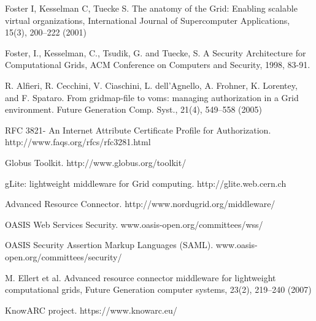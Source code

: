
\begin{thebibliography}{}
%
%

Foster I, Kesselman C, Tuecke S. The anatomy of the Grid: Enabling scalable virtual organizations, International Journal of Supercomputer Applications, 15(3), 200–222 (2001)

Foster, I., Kesselman, C., Tsudik, G. and Tuecke, S. A Security Architecture for Computational Grids, ACM Conference on Computers and Security, 1998, 83-91.

R. Alfieri, R. Cecchini, V. Ciaschini, L. dell’Agnello, A. Frohner, K. Lorentey, and F. Spataro. From gridmap-file to voms: managing authorization in a Grid environment. Future Generation Comp. Syst., 21(4), 549–558 (2005)

RFC 3821- An Internet Attribute Certificate Profile for Authorization. http://www.faqs.org/rfcs/rfc3281.html

Globus Toolkit. http://www.globus.org/toolkit/

gLite: lightweight middleware for Grid computing. http://glite.web.cern.ch

Advanced Resource Connector. http://www.nordugrid.org/middleware/

OASIS Web Services Security. www.oasis-open.org/committees/wss/

OASIS Security Assertion Markup Languages (SAML). www.oasis-open.org/committees/security/

M. Ellert et al. Advanced resource connector middleware for lightweight computational grids, Future Generation computer systems, 23(2), 219–240 (2007)

KnowARC project.  https://www.knowarc.eu/


\end{thebibliography}

